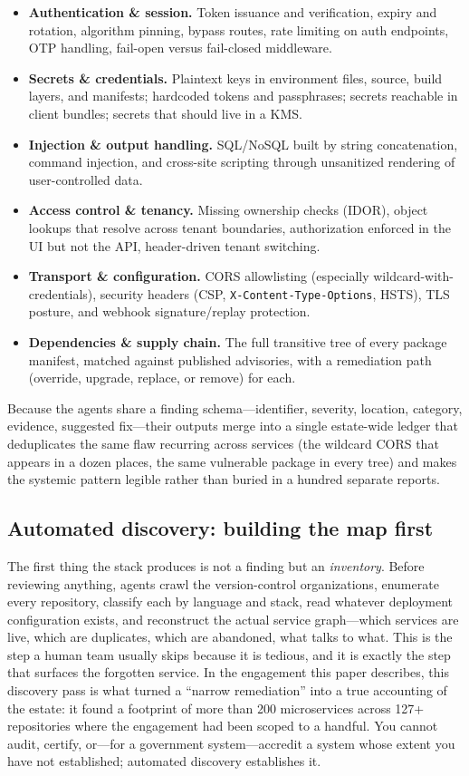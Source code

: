 \documentclass[11pt,letterpaper]{article}
\begin{document}
\begin{itemize}
  \item \textbf{Authentication \& session.} Token issuance and verification,
  expiry and rotation, algorithm pinning, bypass routes, rate limiting on auth
  endpoints, OTP handling, fail-open versus fail-closed middleware.
  \item \textbf{Secrets \& credentials.} Plaintext keys in environment files,
  source, build layers, and manifests; hardcoded tokens and passphrases; secrets
  reachable in client bundles; secrets that should live in a KMS.
  \item \textbf{Injection \& output handling.} SQL/NoSQL built by string
  concatenation, command injection, and cross-site scripting through unsanitized
  rendering of user-controlled data.
  \item \textbf{Access control \& tenancy.} Missing ownership checks (IDOR),
  object lookups that resolve across tenant boundaries, authorization enforced in
  the UI but not the API, header-driven tenant switching.
  \item \textbf{Transport \& configuration.} CORS allowlisting (especially
  wildcard-with-credentials), security headers (CSP, \texttt{X-Content-Type-Options},
  HSTS), TLS posture, and webhook signature/replay protection.
  \item \textbf{Dependencies \& supply chain.} The full transitive tree of every
  package manifest, matched against published advisories, with a remediation path
  (override, upgrade, replace, or remove) for each.
\end{itemize}

Because the agents share a finding schema---identifier, severity, location,
category, evidence, suggested fix---their outputs merge into a single estate-wide
ledger that deduplicates the same flaw recurring across services (the wildcard
CORS that appears in a dozen places, the same vulnerable package in every tree)
and makes the systemic pattern legible rather than buried in a hundred separate
reports.

\subsection{Automated discovery: building the map first}

The first thing the stack produces is not a finding but an \emph{inventory}.
Before reviewing anything, agents crawl the version-control organizations,
enumerate every repository, classify each by language and stack, read whatever
deployment configuration exists, and reconstruct the actual service graph---which
services are live, which are duplicates, which are abandoned, what talks to what.
This is the step a human team usually skips because it is tedious, and it is
exactly the step that surfaces the forgotten service. In the engagement this paper
describes, this discovery pass is what turned a ``narrow remediation'' into a true
accounting of the estate: it found a footprint of more than 200 microservices
across 127+ repositories where the engagement had been scoped to a handful. You
cannot audit, certify, or---for a government system---accredit a system whose
extent you have not established; automated discovery establishes it.
\end{document}

